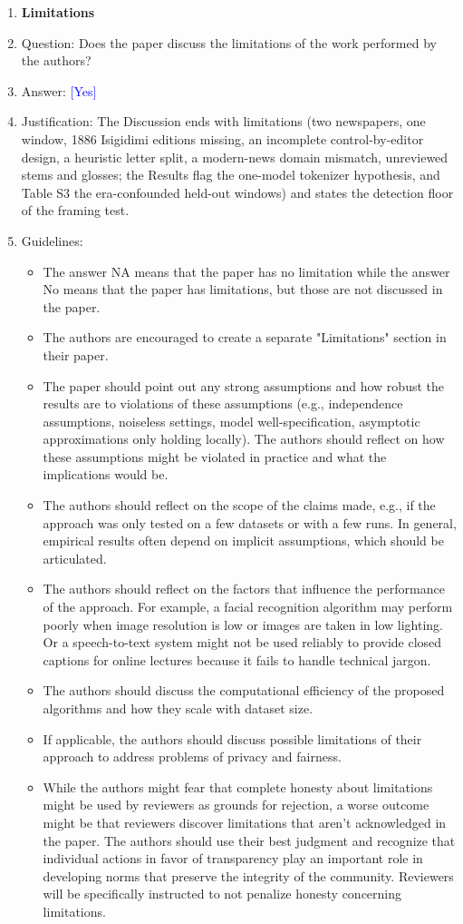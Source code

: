 \documentclass[10pt,letterpaper]{article}
\newcommand{\answerYes}[1][]{\textcolor{blue}{[Yes] #1}}
\begin{document}
\begin{enumerate}
\item {\bf Limitations}
    \item[] Question: Does the paper discuss the limitations of the work performed by the authors?
    \item[] Answer: \answerYes{}
    \item[] Justification: The Discussion ends with limitations (two newspapers, one window, 1886 Isigidimi editions missing, an incomplete control-by-editor design, a heuristic letter split, a modern-news domain mismatch, unreviewed stems and glosses; the Results flag the one-model tokenizer hypothesis, and Table S3 the era-confounded held-out windows) and states the detection floor of the framing test.
    \item[] Guidelines:
    \begin{itemize}
        \item The answer NA means that the paper has no limitation while the answer No means that the paper has limitations, but those are not discussed in the paper. 
        \item The authors are encouraged to create a separate "Limitations" section in their paper.
        \item The paper should point out any strong assumptions and how robust the results are to violations of these assumptions (e.g., independence assumptions, noiseless settings, model well-specification, asymptotic approximations only holding locally). The authors should reflect on how these assumptions might be violated in practice and what the implications would be.
        \item The authors should reflect on the scope of the claims made, e.g., if the approach was only tested on a few datasets or with a few runs. In general, empirical results often depend on implicit assumptions, which should be articulated.
        \item The authors should reflect on the factors that influence the performance of the approach. For example, a facial recognition algorithm may perform poorly when image resolution is low or images are taken in low lighting. Or a speech-to-text system might not be used reliably to provide closed captions for online lectures because it fails to handle technical jargon.
        \item The authors should discuss the computational efficiency of the proposed algorithms and how they scale with dataset size.
        \item If applicable, the authors should discuss possible limitations of their approach to address problems of privacy and fairness.
        \item While the authors might fear that complete honesty about limitations might be used by reviewers as grounds for rejection, a worse outcome might be that reviewers discover limitations that aren't acknowledged in the paper. The authors should use their best judgment and recognize that individual actions in favor of transparency play an important role in developing norms that preserve the integrity of the community. Reviewers will be specifically instructed to not penalize honesty concerning limitations.
    \end{itemize}


\end{enumerate}
\end{document}
